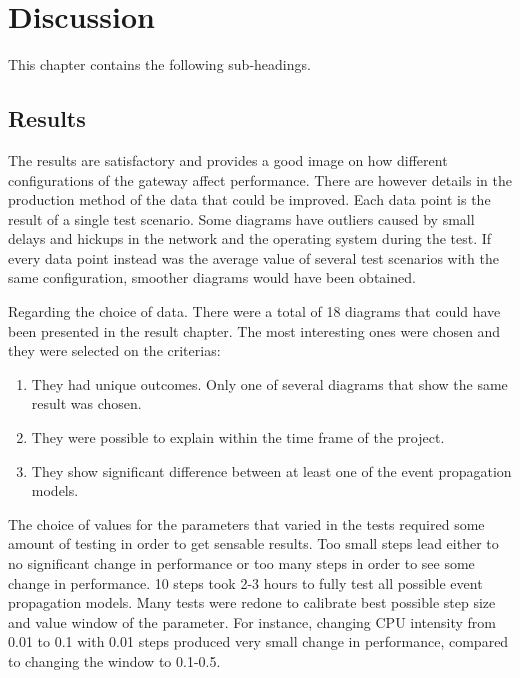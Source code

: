 \chapter{Discussion}
\label{cha:discussion}

This chapter contains the following sub-headings.

\section{Results}
\label{sec:discussion-results}

The results are satisfactory and provides a good image on how different
configurations of the gateway affect performance. There are however details in
the production method of the data that could be improved. Each data point is
the result of a single test scenario. Some diagrams have outliers caused by
small delays and hickups in the network and the operating system during the
test. If every data point instead was the average value of several test
scenarios with the same configuration, smoother diagrams would have been
obtained.

Regarding the choice of data. There were a total of 18 diagrams that could have
been presented in the result chapter. The most interesting ones were chosen and
they were selected on the criterias:

\begin{enumerate}
    \item They had unique outcomes. Only one of several diagrams that show the
        same result was chosen.
    \item They were possible to explain within the time frame of the project.
    \item They show significant difference between at least one of the event propagation
        models.
\end{enumerate}

The choice of values for the parameters that varied in the tests required some
amount of testing in order to get sensable results. Too small steps lead either
to no significant change in performance or too many steps in order to see some
change in performance. 10 steps took 2-3 hours to fully test all possible
event propagation models. Many tests were redone to calibrate best possible
step size and value window of the parameter. For instance, changing CPU
intensity from 0.01 to 0.1 with 0.01 steps produced very small change in
performance, compared to changing the window to 0.1-0.5.

